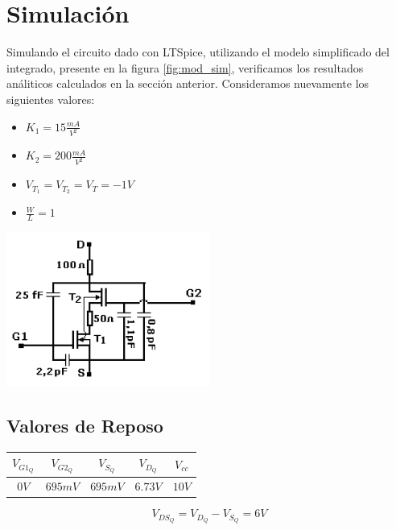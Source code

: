 \documentclass[a4paper, 10pt, spanish]{article}
\begin{document}
\newpage

\section{Simulación}
Simulando el circuito dado con LTSpice, utilizando el modelo simplificado del integrado, presente en la figura \ref{fig:mod_sim}, verificamos los resultados análiticos calculados en la sección anterior. Consideramos nuevamente los siguientes valores:
\begin{itemize}
  \item $K_1=15\frac{mA}{V^2}$
  \item $K_2=200\frac{mA}{V^2}$
  \item $V_{T_1}=V_{T_2}=V_{T}=-1V$
  \item $\frac{W}{L}=1$
\end{itemize}

\begin{center}
  \includegraphics[width=0.5\textwidth]{modelo_simple.png}
  \label{fig:mod_sim}
\end{center}

\subsection{Valores de Reposo}

\begin{center}
  \begin{tabular}{|c|c|c|c|c|}
    \hline
    $V_{G1_Q}$ & $V_{G2_Q}$ & $V_{S_Q}$ & $V_{D_Q}$ & $V_{cc}$ \\
    \hline
    $0V$ & $695mV$ & $695mV$ & $6.73V$ & $10V$ \\
    \hline
  \end{tabular}
  \label{tab:valores_reposo_sim}
\end{center}

\begin{equation}
  V_{DS_{Q}} = V_{D_Q} - V_{S_Q} = 6V
\end{equation}
\end{document}
